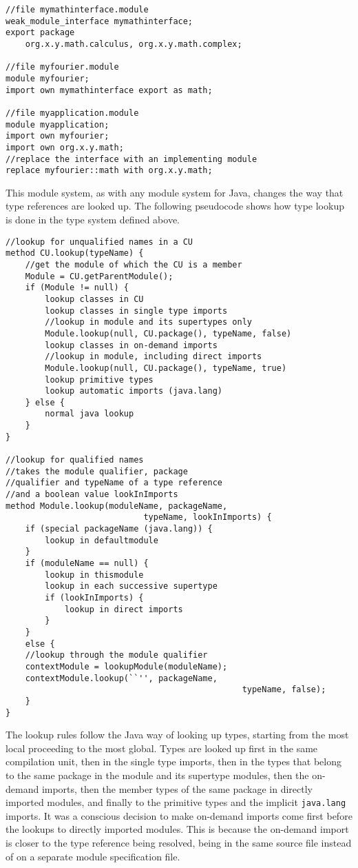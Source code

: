 \begin{lstlisting}[caption=Weak Interfaces]
//file mymathinterface.module
weak_module_interface mymathinterface;
export package 
	org.x.y.math.calculus, org.x.y.math.complex;

//file myfourier.module
module myfourier;
import own mymathinterface export as math;

//file myapplication.module
module myapplication;
import own myfourier;
import own org.x.y.math;
//replace the interface with an implementing module
replace myfourier::math with org.x.y.math;
\end{lstlisting}


This module system, as with any module system for Java, changes the way that type
references are looked up. The following pseudocode shows how type lookup is done in
the type system defined above. 

\begin{lstlisting}[caption = Type Lookup, tabsize=2, morekeywords={method}]
//lookup for unqualified names in a CU
method CU.lookup(typeName) {
	//get the module of which the CU is a member
	Module = CU.getParentModule();
	if (Module != null) {
		lookup classes in CU
		lookup classes in single type imports
		//lookup in module and its supertypes only
		Module.lookup(null, CU.package(), typeName, false)
		lookup classes in on-demand imports
		//lookup in module, including direct imports
		Module.lookup(null, CU.package(), typeName, true)
		lookup primitive types
		lookup automatic imports (java.lang)
	} else {
		normal java lookup
	}
}

//lookup for qualified names
//takes the module qualifier, package
//qualifier and typeName of a type reference
//and a boolean value lookInImports
method Module.lookup(moduleName, packageName, 
							typeName, lookInImports) {
	if (special packageName (java.lang)) {
		lookup in defaultmodule
	}
	if (moduleName == null) {
		lookup in thismodule
		lookup in each successive supertype
		if (lookInImports) {
			lookup in direct imports
		}
	} 
	else {
	//lookup through the module qualifier
	contextModule = lookupModule(moduleName);
	contextModule.lookup(``'', packageName, 
												typeName, false);
	}
}
\end{lstlisting}

The lookup rules follow the Java way of looking up types,
starting from the most local proceeding to the most global. Types are looked up
first in the same compilation unit, then in the single type imports,
then in the types that belong to the same package in the module and its supertype 
modules, then the on-demand imports, then the member types of the same package
in directly imported modules, and finally to the primitive types and the 
implicit {\tt java.lang} imports. It was a conscious decision to make on-demand imports
come first before the lookups to directly imported modules. This is because the on-demand import
is closer to the type reference being resolved, being in the same source file instead of
on a separate module specification file.

